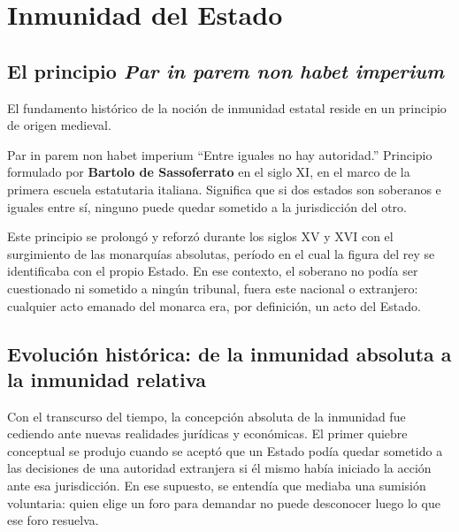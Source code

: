 \documentclass[12pt,oneside]{book}
\begin{document}

\chapter{Inmunidad del Estado}

\section{El principio \textit{Par in parem non habet imperium}}

El fundamento histórico de la noción de inmunidad estatal reside en un principio de origen medieval.

\begin{definition}{Par in parem non habet imperium}
``Entre iguales no hay autoridad.'' Principio formulado por \textbf{Bartolo de Sassoferrato} en el siglo XI, en el marco de la primera escuela estatutaria italiana. Significa que si dos estados son soberanos e iguales entre sí, ninguno puede quedar sometido a la jurisdicción del otro.
\end{definition}

Este principio se prolongó y reforzó durante los siglos XV y XVI con el surgimiento de las monarquías absolutas, período en el cual la figura del rey se identificaba con el propio Estado. En ese contexto, el soberano no podía ser cuestionado ni sometido a ningún tribunal, fuera este nacional o extranjero: cualquier acto emanado del monarca era, por definición, un acto del Estado.

\section{Evolución histórica: de la inmunidad absoluta a la inmunidad relativa}

Con el transcurso del tiempo, la concepción absoluta de la inmunidad fue cediendo ante nuevas realidades jurídicas y económicas. El primer quiebre conceptual se produjo cuando se aceptó que un Estado podía quedar sometido a las decisiones de una autoridad extranjera si él mismo había iniciado la acción ante esa jurisdicción. En ese supuesto, se entendía que mediaba una sumisión voluntaria: quien elige un foro para demandar no puede desconocer luego lo que ese foro resuelva.
\end{document}
